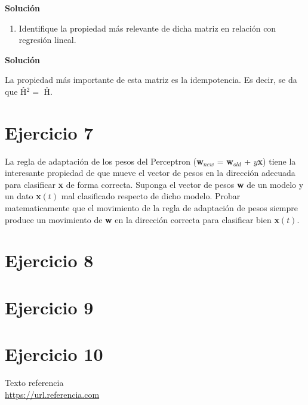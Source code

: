 \documentclass[11pt,a4paper]{article}
\newcommand{\answer}{\noindent\textbf{Solución}}
\begin{document}
\answer

\begin{enumerate}[resume,label=\textit{\alph*})]
	\item Identifique la propiedad más relevante de dicha matriz en relación con regresión lineal.
\end{enumerate}

\answer

La propiedad más importante de esta matriz es la idempotencia. Es decir, se da que Ĥ$^2 = $ Ĥ.

\section*{Ejercicio 7}

\noindent La regla de adaptación de los pesos del Perceptron (\textbf{w}$_{new}$ = \textbf{w}$_{old}$ + $y$\textbf{x}) tiene
la interesante propiedad de que mueve el vector de pesos en la dirección adecuada para clasificar \textbf{x} de forma
correcta. Suponga el vector de pesos \textbf{w} de un modelo y un dato \textbf{x}$(t)$ mal clasificado respecto de dicho
modelo. Probar matematicamente que el movimiento de la regla de adaptación de pesos siempre produce un movimiento de
\textbf{w} en la dirección correcta para clasificar bien \textbf{x}$(t)$.


\section*{Ejercicio 8}

\section*{Ejercicio 9}

\section*{Ejercicio 10}

\newpage

\begin{thebibliography}{5}

Texto referencia
\\\url{https://url.referencia.com}

\end{thebibliography}
\end{document}
